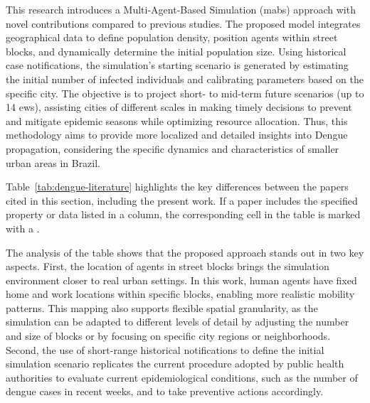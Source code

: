 This research introduces a Multi-Agent-Based Simulation (\gls{mabs}) approach
with novel contributions compared to previous studies. The proposed model integrates
geographical data to define population density, position agents within street
blocks, and dynamically determine the initial population size. Using historical
case notifications, the simulation's starting scenario is generated by estimating
the initial number of infected individuals and calibrating parameters based on
the specific city. The objective is to project short- to mid-term future
scenarios (up to 14 \gls{ews}), assisting cities of different scales in making
timely decisions to prevent and mitigate epidemic seasons while optimizing
resource allocation. Thus, this methodology aims to provide more localized and
detailed insights into Dengue propagation, considering the specific dynamics and
characteristics of smaller urban areas in Brazil.

Table~\ref{tab:dengue-literature} highlights the key differences between the
papers cited in this section, including the present work. If a paper includes the
specified property or data listed in a column, the corresponding cell in the
table is marked with a \checkmark.

The analysis of the table shows that the proposed approach stands out in two key
aspects. First, the location of agents in street blocks brings the simulation
environment closer to real urban settings. In this work, human agents have fixed
home and work locations within specific blocks, enabling more realistic mobility
patterns. This mapping also supports flexible spatial granularity, as the
simulation can be adapted to different levels of detail by adjusting the number
and size of blocks or by focusing on specific city regions or neighborhoods.
Second, the use of short-range historical notifications to define the initial
simulation scenario replicates the current procedure adopted by public health
authorities to evaluate current epidemiological conditions, such as the number
of dengue cases in recent weeks, and to take preventive actions accordingly.


